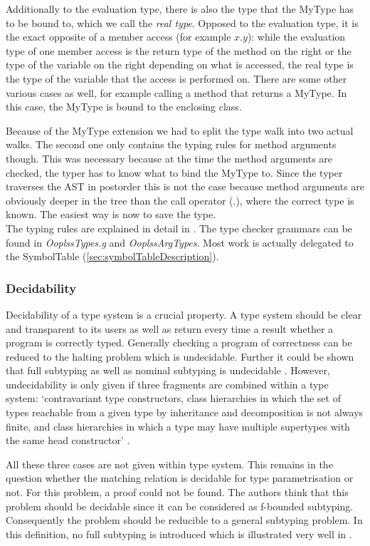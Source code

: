Additionally to the evaluation type, there is also the type that the
MyType has to be bound to, which we call the \emph{real type}. Opposed
to the evaluation type, it is the exact opposite of a member access
(for example $x.y$): while the evaluation type of one member access
is the return type of the method on the right or the type of the variable
on the right depending on what is accessed, the real type is the type
of the variable that the access is performed on. There are some other
various cases as well, for example calling a method that returns
a MyType. In this case, the MyType is bound to the enclosing class.


Because of the MyType extension we had to split the type walk into two
actual walks. The second one only contains the typing rules for method
arguments though. This was necessary because at the time the method
arguments are checked, the typer has to know what to bind the MyType
to. Since the typer traverses the AST in postorder this is not the case
because method arguments are obviously deeper in the tree than the
call operator (.), where the correct type is known. The easiest way
is now to save the type. \\

The typing rules are explained in detail in . The
type checker grammars can be found in \emph{OoplssTypes.g} and
\emph{OoplssArgTypes}. Most work is actually delegated to
the SymbolTable (\ref{sec:symbolTableDescription}).

\subsubsection{Decidability}
Decidability of a type system is a crucial property. A type system should
be clear and transparent to its users as well as return every time a
result whether a program is correctly typed. Generally checking a program
of correctness can be reduced to the halting problem which is undecidable.
Further it could be shown that full subtyping as well as nominal
subtyping is undecidable \cite{kennedy_decidability_2006}. However,
undecidability is only given if three fragments are combined within
a type system: `contravariant type constructors, class hierarchies in
which the set of types reachable from a given type by inheritance and
decomposition is not always finite, and class hierarchies in which
a type may have multiple supertypes with the same head constructor'
\cite{kennedy_decidability_2006}.

All these three cases are not given within \ooplsss type system. This
remains in the question whether the matching relation is decidable for
type parametrisation or not. For this problem, a proof could not be
found. The authors think that this problem should be decidable since
it can be considered as f-bounded subtyping. Consequently the
problem should be reducible to a general subtyping problem. In this
definition, no full subtyping is introduced which is illustrated very
well in \cite{pierce_types_2002}.

